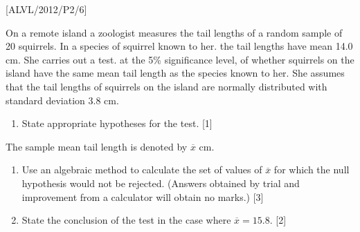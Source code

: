 \item {[}ALVL/2012/P2/6{]}

On a remote island a zoologist measures the tail lengths of a random
sample of 20 squirrels. In a species of squirrel known to her. the
tail lengths have mean 14.0 cm. She carries out a test. at the 5\%
significance level, of whether squirrels on the island have the same
mean tail length as the species known to her. She assumes that the
tail lengths of squirrels on the island are normally distributed with
standard deviation 3.8 cm. 
\begin{enumerate}
\item State appropriate hypotheses for the test. {[}1{]}
\end{enumerate}
The sample mean tail length is denoted by $\overline{x}$ cm.
\begin{enumerate}
\item Use an algebraic method to calculate the set of values of $\overline{x}$
for which the null hypothesis would not be rejected. (Answers obtained
by trial and improvement from a calculator will obtain no marks.)
{[}3{]}
\item State the conclusion of the test in the case where $\overline{x}=15.8$.
{[}2{]}
\end{enumerate}
